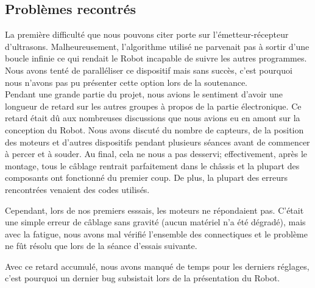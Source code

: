 \subsection{Problèmes recontrés}

La première difficulté que nous pouvons citer porte sur l'émetteur-récepteur d'ultrasons.
Malheureusement, l'algorithme utilisé ne parvenait pas à sortir d'une boucle infinie ce qui rendait le Robot incapable de suivre les autres programmes.
Nous avons tenté de paralléliser ce dispositif mais sans succès, c'est pourquoi nous n'avons pas pu présenter cette option lors de la soutenance.\\

Pendant une grande partie du projet, nous avions le sentiment d'avoir une longueur de retard sur les autres groupes à propos de la partie électronique. 
Ce retard était dû aux nombreuses discussions que nous avions eu en amont sur la conception du Robot.
Nous avons discuté du nombre de capteurs, de la position des moteurs et d'autres dispositifs pendant plusieurs séances avant de commencer à percer et à souder.
Au final, cela ne nous a pas desservi; effectivement, après le montage, tous le câblage rentrait parfaitement dans le châssis et la plupart des composants ont fonctionné du premier coup.
De plus, la plupart des erreurs rencontrées venaient des codes utilisés.

Cependant, lors de nos premiers esssais, les moteurs ne répondaient pas. C'était une simple erreur de câblage sans gravité (aucun matériel n'a été dégradé), 
mais avec la fatigue, nous avons mal vérifié l'ensemble des connectiques et le problème ne fût résolu que lors de la séance d'essais suivante.

Avec ce retard accumulé, nous avons manqué de temps pour les derniers réglages, c'est pourquoi un dernier bug subsistait lors de la présentation du Robot.\\

